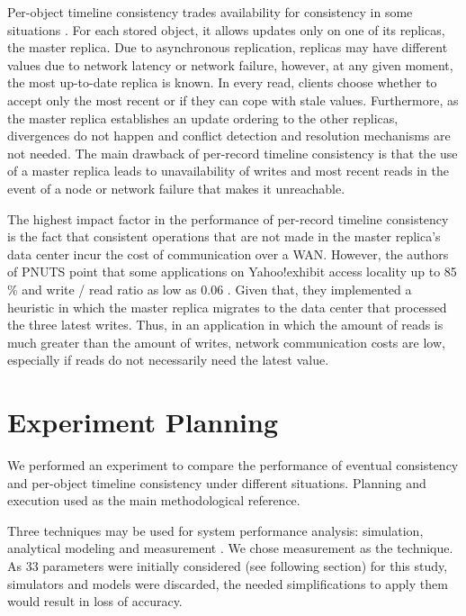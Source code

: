 \documentclass[doublespacing]{bmcart}
\begin{document}
Per-object timeline consistency trades availability for consistency in some situations \cite{Cooper2008}. For each stored object, it allows updates only on one of its
replicas, the master replica. Due to asynchronous replication, replicas may have
different values due to network latency or network failure, however, at any given moment,
the most up-to-date replica is known. In every read, clients choose whether to
accept only the most recent or if they can cope with stale values. Furthermore, as the master replica
establishes an update ordering to the other replicas, divergences do
not happen and conflict detection and resolution mechanisms are not needed. The
main drawback of per-record timeline consistency is that the use of a master replica
leads to unavailability of writes and most recent reads in the event of a node or network failure
that makes it unreachable.

The highest impact factor in the performance of per-record timeline consistency is the fact
that consistent operations that are not made in the master replica's data center
incur the cost of communication over a WAN.  However, the authors of PNUTS
point that some applications on Yahoo!exhibit access locality up to 85
\% and write / read ratio as low as 0.06 \cite{Kadambi2011, Cooper2008}. Given
that, they implemented a heuristic in which the master replica migrates to the
data center that processed the three latest writes. Thus, in an application in which
the amount of reads is much greater than the amount of writes, network
communication costs are low, especially if reads do not necessarily need the
latest value.

\section{Experiment Planning}

We performed an experiment to compare the performance of eventual consistency and per-object timeline consistency under different situations. Planning and execution used \cite{Jain1991} as the main
methodological reference.

Three techniques may be used for system performance analysis: simulation,
analytical modeling and measurement \cite{Jain1991}. We chose measurement as the technique. As 33 parameters were
initially considered (see following section) for this study, simulators and models were discarded, the needed simplifications to apply them would result in loss of accuracy.
\end{document}
